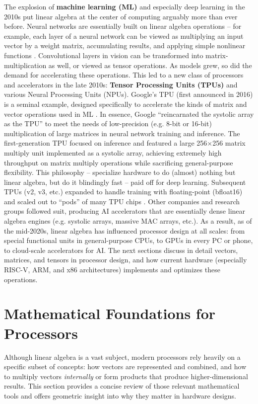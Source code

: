 The explosion of \textbf{machine learning (ML)} and especially deep learning in the 2010s put linear algebra at the center of computing arguably more than ever before. Neural networks are essentially built on linear algebra operations – for example, each layer of a neural network can be viewed as multiplying an input vector by a weight matrix, accumulating results, and applying simple nonlinear functions \cite{abdi2001linear}. Convolutional layers in vision can be transformed into matrix-multiplication as well, or viewed as tensor operations. As models grew, so did the demand for accelerating these operations. This led to a new class of processors and accelerators in the late 2010s: \textbf{Tensor Processing Units (TPUs)} and various Neural Processing Units (NPUs). Google’s TPU (first announced in 2016) is a seminal example, designed specifically to accelerate the kinds of matrix and vector operations used in ML \cite{jouppi2017indatacenter}. In essence, Google “reincarnated the systolic array as the TPU” to meet the needs of low-precision (e.g. 8-bit or 16-bit) multiplication of large matrices in neural network training and inference. The first-generation TPU focused on inference and featured a large 256$\times$256 matrix multiply unit implemented as a systolic array, achieving extremely high throughput on matrix multiply operations while sacrificing general-purpose flexibility. This philosophy – specialize hardware to do (almost) nothing but linear algebra, but do it blindingly fast – paid off for deep learning. Subsequent TPUs (v2, v3, etc.) expanded to handle training with floating-point (bfloat16) and scaled out to “pods” of many TPU chips \cite{jouppi2020domain, wang2019bfloat16}. Other companies and research groups followed suit, producing AI accelerators that are essentially dense linear algebra engines (e.g. systolic arrays, massive MAC arrays, etc.). As a result, as of the mid-2020s, linear algebra has influenced processor design at all scales: from special functional units in general-purpose CPUs, to GPUs in every PC or phone, to cloud-scale accelerators for AI. The next sections discuss in detail vectors, matrices, and tensors in processor design, and how current hardware (especially RISC-V, ARM, and x86 architectures) implements and optimizes these operations.

\section{Mathematical Foundations for Processors}
Although linear algebra is a vast subject, modern processors rely heavily on a specific subset of concepts: how vectors are represented and combined, and how to multiply vectors \emph{internally} or form products that produce higher-dimensional results. This section provides a concise review of those relevant mathematical tools and offers geometric insight into why they matter in hardware designs.

